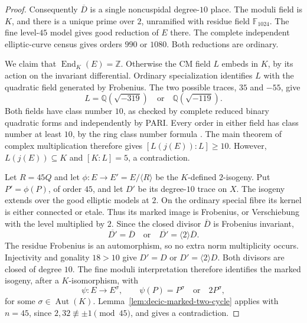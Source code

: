 \begin{proof}
Consequently $\overline D$ is a single noncuspidal degree-$10$
place. The moduli field is $K$, and there is a unique prime over
$2$, unramified with residue field $\mathbb F_{1024}$.
The fine level-$45$ model gives good reduction of $E$ there.
The complete independent elliptic-curve census gives orders
$990$ or $1080$. Both reductions are ordinary.

We claim that $\operatorname{End}_K(E)=\mathbb Z$.
Otherwise the CM field $L$ embeds in $K$, by its action on the
invariant differential. Ordinary specialization identifies $L$
with the quadratic field generated by Frobenius.
The two possible traces, $35$ and $-55$, give
\[
                         L=\mathbb Q(\sqrt{-319})
                  \quad\text{or}\quad\mathbb Q(\sqrt{-119}).
\]
Both fields have class number $10$, as checked by complete reduced
binary quadratic forms and independently by PARI.
Every order in either field has class number at least $10$,
by the ring class number formula \cite[Section~7]{Cox}.
The main theorem of complex multiplication
\cite[Section~11]{Cox} therefore gives
$[L(j(E)):L]\geq10$.
However, $L(j(E))\subseteq K$ and $[K:L]=5$, a contradiction.

Let $R=45Q$ and let $\phi:E\to E'=E/\langle R\rangle$ be the
$K$-defined $2$-isogeny. Put $P'=\phi(P)$, of order $45$, and let
$D'$ be its degree-$10$ trace on $X$.
The isogeny extends over the good elliptic models at $2$.
On the ordinary special fibre its kernel is either connected
or etale. Thus its marked image is Frobenius, or Verschiebung
with the level multiplied by $2$.
Since the closed divisor $\overline D$ is Frobenius invariant,
\[
                   \overline {D'}=\overline D
          \quad\text{or}\quad
                   \overline {D'}=\langle2\rangle\overline D.
\]
The residue Frobenius is an automorphism, so no extra norm
multiplicity occurs.
Injectivity and gonality $18>10$ give
$D'=D$ or $D'=\langle2\rangle D$.
Both divisors are closed of degree $10$.
The fine moduli interpretation therefore identifies the marked
isogeny, after a $K$-isomorphism, with
\[
             \psi:E\longrightarrow E^\sigma,
             \qquad\psi(P)=P^\sigma\quad\text{or}\quad2P^\sigma,
\]
for some $\sigma\in\operatorname{Aut}(K)$.
Lemma~\ref{lem:decic-marked-two-cycle} applies with $n=45$,
since $2,32\not\equiv\pm1\pmod{45}$, and gives a contradiction.
\end{proof}
